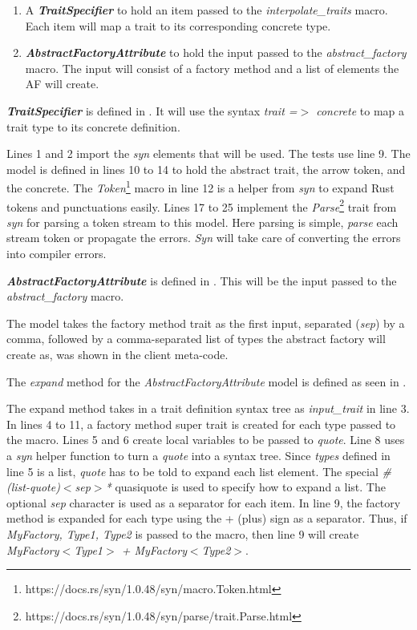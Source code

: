 \begin{enumerate}
	\item A \textbf{\textit{TraitSpecifier}} to hold an item passed to the \textit{interpolate\_traits} macro.
	      Each item will map a trait to its corresponding concrete type.
	\item \textbf{\textit{AbstractFactoryAttribute}} to hold the input passed to the \textit{abstract\_factory} macro.
	      The input will consist of a factory method and a list of elements the AF will create.
\end{enumerate}

\textbf{\textit{TraitSpecifier}} is defined in .
It will use the syntax \textit{trait =$>$ concrete} to map a trait type to its concrete definition.

Lines 1 and 2 import the \textit{syn} elements that will be used.
The tests use line 9.
The model is defined in lines 10 to 14 to hold the abstract trait, the arrow token, and the concrete.
The \textit{Token}\footnote{https://docs.rs/syn/1.0.48/syn/macro.Token.html} macro in line 12 is a helper from \textit{syn} to expand Rust tokens and punctuations easily.
Lines 17 to 25 implement the \textit{Parse}\footnote{https://docs.rs/syn/1.0.48/syn/parse/trait.Parse.html} trait from \textit{syn} for parsing a token stream to this model.
Here parsing is simple, \textit{parse} each stream token or propagate the errors.
\textit{Syn} will take care of converting the errors into compiler errors.

\textbf{\textit{AbstractFactoryAttribute}} is defined in .
This will be the input passed to the \textit{abstract\_factory} macro.

The model takes the factory method trait as the first input, separated (\textit{sep}) by a comma, followed by a comma-separated list of types the abstract factory will create as, was shown in the client meta-code.

The \textit{expand} method for the \textit{AbstractFactoryAttribute} model is defined as seen in .

The expand method takes in a trait definition syntax tree as \textit{input\_trait} in line 3.
In lines 4 to 11, a factory method super trait is created for each type passed to the macro.
Lines 5 and 6 create local variables to be passed to \textit{quote}.
Line 8 uses a \textit{syn} helper function to turn a \textit{quote} into a syntax tree.
Since \textit{types} defined in line 5 is a list, \textit{quote} has to be told to expand each list element.
The special \textit{\#(list-quote)$<$sep$>$*} quasiquote is used to specify how to expand a list.
The optional \textit{sep} character is used as a separator for each item.
In line 9, the factory method is expanded for each type using the + (plus) sign as a separator.
Thus, if \textit{MyFactory, Type1, Type2} is passed to the macro, then line 9 will create \textit{MyFactory$<$Type1$>$ + MyFactory$<$Type2$>$}.

